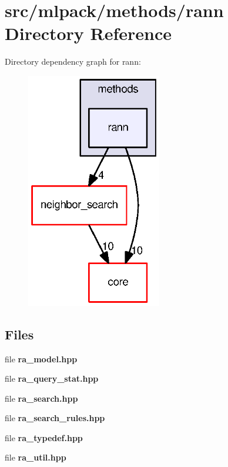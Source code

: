 \section{src/mlpack/methods/rann Directory Reference}
\label{dir_b3b2a45410bb0010ddefc979f918eabf}
Directory dependency graph for rann\+:
\nopagebreak
\begin{figure}[H]
\begin{center}
\leavevmode
\includegraphics[width=167pt]{dir_b3b2a45410bb0010ddefc979f918eabf_dep}
\end{center}
\end{figure}
\subsection*{Files}
\begin{DoxyCompactItemize}
\item 
file {\bf ra\+\_\+model.\+hpp}
\item 
file {\bf ra\+\_\+query\+\_\+stat.\+hpp}
\item 
file {\bf ra\+\_\+search.\+hpp}
\item 
file {\bf ra\+\_\+search\+\_\+rules.\+hpp}
\item 
file {\bf ra\+\_\+typedef.\+hpp}
\item 
file {\bf ra\+\_\+util.\+hpp}
\end{DoxyCompactItemize}

